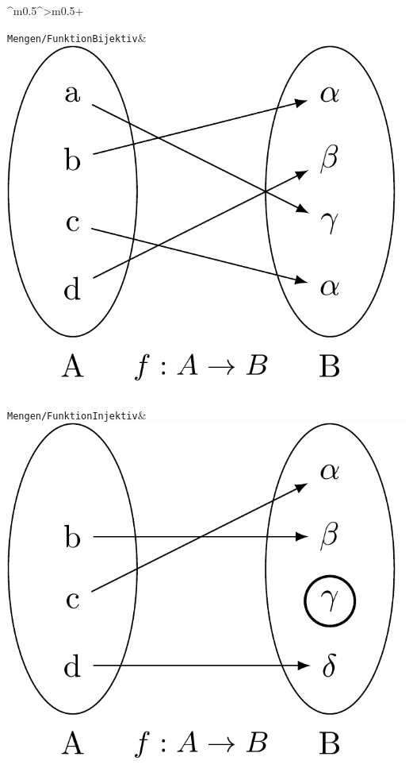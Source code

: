\documentclass[PLAIN]{Lilly}
\begin{document}
\begin{tabularx}{\linewidth}{^m{0.5\linewidth}^>{\centering\arraybackslash}m{0.5\linewidth}+}
\midrule 
{} {}
 {}\verb|Mengen/FunktionBijektiv|& \includegraphics[width=0.8\linewidth]{Mengen/FunktionBijektiv-pdf.pdf}\\
\midrule {} {}\verb|Mengen/FunktionInjektiv|& \includegraphics[width=0.8\linewidth]{Mengen/FunktionInjektiv-pdf.pdf}\\

\end{tabularx}
\end{document}
